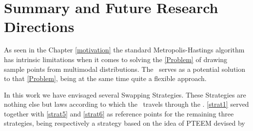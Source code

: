 \documentclass{book}
\begin{document}
\chapter*{Summary and Future Research Directions}

As seen in the Chapter \ref{motivation} the standard Metropolis-Hastings algorithm has intrinsic limitations when it comes to solving the \ref{Problem} of drawing sample points from multimodal distributions. The \PT\, serves as a potential solution to that \ref{Problem}, being at the same time quite a flexible approach. 

In this work we have envisaged several Swapping Strategies. These Strategies are nothing else but laws according to which the \PT\, travels through the \sspace. \ref{strat1} served together with \ref{strat5} and \ref{strat6} as reference points for the remaining three strategies, being respectively a strategy based on the idea of \textsc{PTEEM} devised by \	
\end{document}
